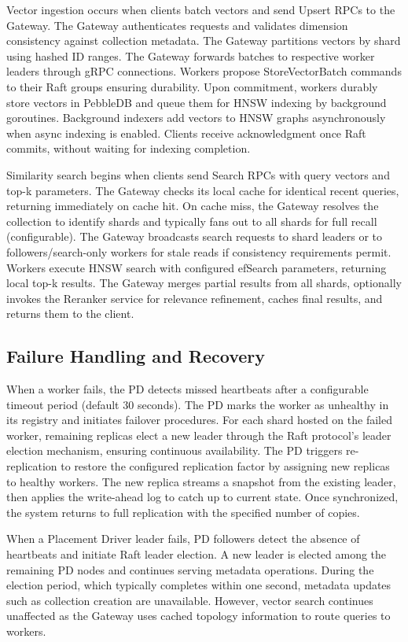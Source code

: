\documentclass[conference]{IEEEtran}
\begin{document}
Vector ingestion occurs when clients batch vectors and send Upsert RPCs to the Gateway. The Gateway authenticates requests and validates dimension consistency against collection metadata. The Gateway partitions vectors by shard using hashed ID ranges. The Gateway forwards batches to respective worker leaders through gRPC connections. Workers propose StoreVectorBatch commands to their Raft groups ensuring durability. Upon commitment, workers durably store vectors in PebbleDB and queue them for HNSW indexing by background goroutines. Background indexers add vectors to HNSW graphs asynchronously when async indexing is enabled. Clients receive acknowledgment once Raft commits, without waiting for indexing completion.

Similarity search begins when clients send Search RPCs with query vectors and top-k parameters. The Gateway checks its local cache for identical recent queries, returning immediately on cache hit. On cache miss, the Gateway resolves the collection to identify shards and typically fans out to all shards for full recall (configurable). The Gateway broadcasts search requests to shard leaders or to followers/search-only workers for stale reads if consistency requirements permit. Workers execute HNSW search with configured efSearch parameters, returning local top-k results. The Gateway merges partial results from all shards, optionally invokes the Reranker service for relevance refinement, caches final results, and returns them to the client.

\subsection{Failure Handling and Recovery}

When a worker fails, the PD detects missed heartbeats after a configurable timeout period (default 30 seconds). The PD marks the worker as unhealthy in its registry and initiates failover procedures. For each shard hosted on the failed worker, remaining replicas elect a new leader through the Raft protocol's leader election mechanism, ensuring continuous availability. The PD triggers re-replication to restore the configured replication factor by assigning new replicas to healthy workers. The new replica streams a snapshot from the existing leader, then applies the write-ahead log to catch up to current state. Once synchronized, the system returns to full replication with the specified number of copies.

When a Placement Driver leader fails, PD followers detect the absence of heartbeats and initiate Raft leader election. A new leader is elected among the remaining PD nodes and continues serving metadata operations. During the election period, which typically completes within one second, metadata updates such as collection creation are unavailable. However, vector search continues unaffected as the Gateway uses cached topology information to route queries to workers.
\end{document}
